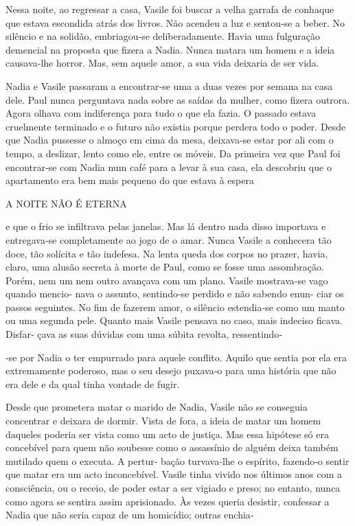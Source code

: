 Nessa noite, ao regressar a casa, Vasile foi buscar a velha garrafa de
conhaque que estava escondida atrás dos livros. Não acendeu a luz e
sentou‑se a beber. No silêncio e na solidão, embriagou‑se
deliberadamente. Havia uma fulguração demencial na proposta que fizera a
Nadia. Nunca matara um homem e a ideia causava‑lhe horror. Mas, sem
aquele amor, a sua vida deixaria de ser vida.

Nadia e Vasile passaram a encontrar‑se uma a duas vezes por semana na
casa dele. Paul nunca perguntava nada sobre as saídas da mulher, como
fizera outrora. Agora olhava com indiferença para tudo o que ela fazia.
O passado estava cruelmente terminado e o futuro não existia porque
perdera todo o poder. Desde que Nadia pussesse o almoço em cima da mesa,
deixava‑se estar por ali com o tempo, a deslizar, lento como ele, entre
os móveis. Da primeira vez que Paul foi encontrar‑se com Nadia num café
para a levar à sua casa, ela descobriu que o apartamento era bem mais
pequeno do que estava à espera

A NOITE NÃO É ETERNA

e que o frio se infiltrava pelas janelas. Mas lá dentro nada disso
importava e entregava‑se completamente ao jogo de o amar. Nunca Vasile a
conhecera tão doce, tão solícita e tão indefesa. Na lenta queda dos
corpos no prazer, havia, claro, uma alusão secreta à morte de Paul, como
se fosse uma assombração. Porém, nem um nem outro avançava com um plano.
Vasile mostrava‑se vago quando mencio‑ nava o assunto, sentindo‑se
perdido e não sabendo enun‑ ciar os passos seguintes. No fim de fazerem
amor, o silêncio estendia‑se como um manto ou uma segunda pele. Quanto
mais Vasile pensava no caso, mais indeciso ficava. Disfar‑ çava as suas
dúvidas com uma súbita revolta, ressentindo‑

‑se por Nadia o ter empurrado para aquele conflito. Aquilo que sentia
por ela era extremamente poderoso, mas o seu desejo puxava‑o para uma
história que não era dele e da qual tinha vontade de fugir.

Desde que prometera matar o marido de Nadia, Vasile não se conseguia
concentrar e deixara de dormir. Vista de fora, a ideia de matar um homem
daqueles poderia ser vista como um acto de justiça. Mas essa hipótese só
era concebível para quem não soubesse como o assassínio de alguém deixa
também mutilado quem o executa. A pertur‑ bação turvava‑lhe o espírito,
fazendo‑o sentir que matar era um acto inconcebível. Vasile tinha vivido
nos últimos anos com a consciência, ou o receio, de poder estar a ser
vigiado e preso; no entanto, nunca como agora se sentira assim
aprisionado. Às vezes queria desistir, confessar a Nadia que não seria
capaz de um homicídio; outras enchia‑

